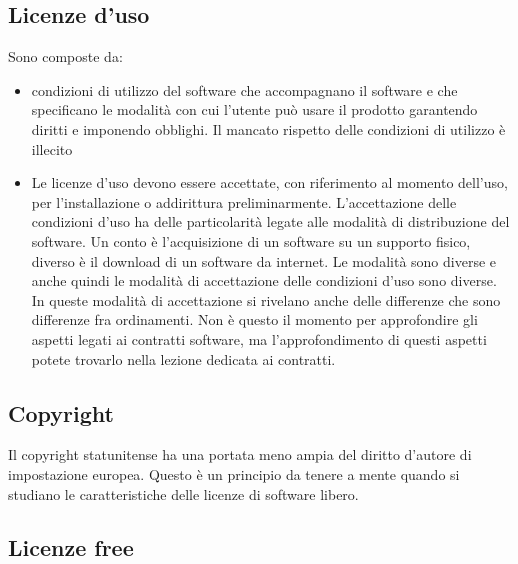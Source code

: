 \subsection{Licenze d'uso}

Sono composte da:

\begin{itemize}
    \item condizioni di utilizzo del software che accompagnano il software e che specificano le modalità con cui l'utente può usare il prodotto garantendo diritti e imponendo obblighi. Il mancato rispetto delle condizioni di utilizzo è illecito
    \item Le licenze d'uso devono essere accettate, con riferimento al momento dell'uso, per l'installazione o addirittura preliminarmente. L'accettazione delle condizioni d'uso ha delle particolarità legate alle modalità di distribuzione del software. Un conto è l'acquisizione di un software su un supporto fisico, diverso è il download di un software da internet. Le modalità sono diverse e anche quindi le modalità di accettazione delle condizioni d'uso sono diverse. In queste modalità di accettazione si rivelano anche delle differenze che sono differenze fra ordinamenti. Non è questo il momento per approfondire gli aspetti legati ai contratti software, ma l'approfondimento di questi aspetti potete trovarlo nella lezione dedicata ai contratti.
\end{itemize}

\subsection{Copyright}

Il copyright statunitense ha una portata meno ampia del diritto d'autore di impostazione europea. Questo è un principio da tenere a mente quando si studiano le caratteristiche delle licenze di software libero. 

\subsection{Licenze free}

